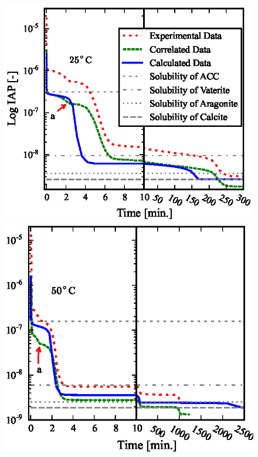 \documentclass[preprint,3p,a4paper,times,12pt,authoryear]{elsarticle}
\begin{document}

\begin{figure}[h!tb]
\begin{center}
\includegraphics{fig_10a_IAP_25C}
\includegraphics{fig_10b_IAP_50C}

\end{center}
\end{figure}
\end{document}
